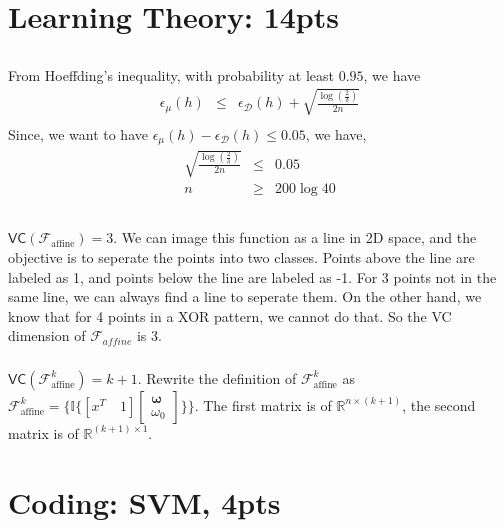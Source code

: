 \documentclass[12pt]{article}
\begin{document}
\section{Learning Theory: 14pts}
\subsection{}
From Hoeffding's inequality, with probability at least $0.95$, we have
\begin{eqnarray}
    \epsilon_{\mu}(h) &\le& \epsilon_{\mathcal{D}}(h) + \sqrt{\frac{\log(\frac{2}{\delta})}{2n}} \nonumber \\
\end{eqnarray}
Since, we want to have $\epsilon_{\mu}(h) - \epsilon_{\mathcal{D}}(h) \le 0.05$, we have,
\begin{eqnarray}
    \sqrt{\frac{\log(\frac{2}{\delta})}{2n}} &\le& 0.05 \nonumber \\
    n &\ge& 200 \log 40 \nonumber
\end{eqnarray}

\subsection{}
\subsubsection{}
$\mathsf{V} \mathsf{C} (\mathcal{F} _{\text{affine}}) = 3$.
We can image this function as a line in 2D space, and the objective is to seperate the points into two classes. Points above the line are labeled as 1, and points below the line are labeled as -1. For 3 points not in the same line, we can always find a line to seperate them. 
On the other hand, we know that for 4 points in a XOR pattern, we cannot do that. So the VC dimension of $\mathcal{F} _{affine}$ is 3.

\subsubsection{}
$\mathsf{V} \mathsf{C} (\mathcal{F}^{k} _{\text{affine}}) = k+1$.
Rewrite the definition of $\mathcal{F}^{k} _{\text{affine}}$ as $\mathcal{F}^{k} _{\text{affine}} = \{ \mathbb{I} \{ \left [ x^T \quad 1 \right ]  \begin{bmatrix} \mathbf{\omega}\\\omega_0 \end{bmatrix}  \}\}$.
The first matrix is of $\mathbb{R} ^{n\times( k+1 ) }$, the second matrix is of $\mathbb{R} ^{(k+1)\times 1}$. 

\subsubsection{}


\newpage

\section{Coding: SVM, 4pts}
\end{document}
